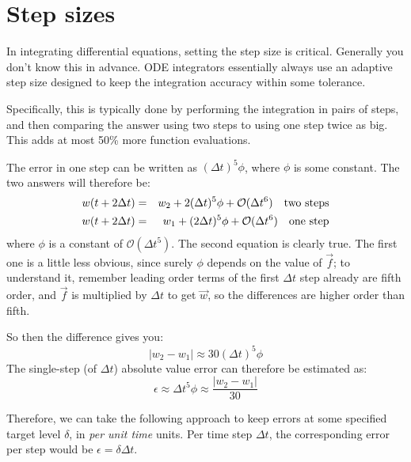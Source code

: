 \section{Step sizes}

In integrating differential equations, setting the step size is
critical. Generally you don't know this in advance. ODE integrators
essentially always use an adaptive step size designed to keep the
integration accuracy within some tolerance.

Specifically, this is typically done by performing the integration in
pairs of steps, and then comparing the answer using two steps to using
one step twice as big. This adds at most 50\% more function
evaluations.

The error in one step can be written as $(\Delta t)^5 \phi$, where
$\phi$ is some constant.  The two answers will therefore be:
\begin{eqnarray}
w(t+ 2\Delta t) &=& w_2 + 2 (\Delta t)^5 \phi + \mathcal{O}(\Delta
t^6) \quad\mathrm{two~steps} 
\cr
w(t+ 2\Delta t) &=& w_1 + (2\Delta t)^5 \phi + \mathcal{O}(\Delta t^6)
\quad\mathrm{one~step} 
\end{eqnarray}
where $\phi$ is a constant of $\mathcal{O}(\Delta t^5)$. The second
equation is clearly true. The first one is a little less obvious,
since surely $\phi$ depends on the value of $\vec{f}$; to understand
it, remember leading order terms of the first $\Delta t$ step already
are fifth order, and $\vec{f}$ is multiplied by $\Delta t$ to get
$\vec{w}$, so the differences are higher order than fifth. 

So then the difference gives you:
\begin{equation}
  \left|w_2 - w_1\right| \approx 30 (\Delta t)^5 \phi
\end{equation}
The single-step (of $\Delta t$) absolute value error can therefore be
estimated as:
\begin{equation}
\epsilon \approx \Delta t^5 \phi \approx \frac{\left|w_2 -
  w_1\right|}{30}
\end{equation}

Therefore, we can take the following approach to keep errors at some
specified target level $\delta$, in {\it per unit time} units. Per
time step $\Delta t$, the corresponding error per step would be
$\epsilon = \delta\Delta t$.

